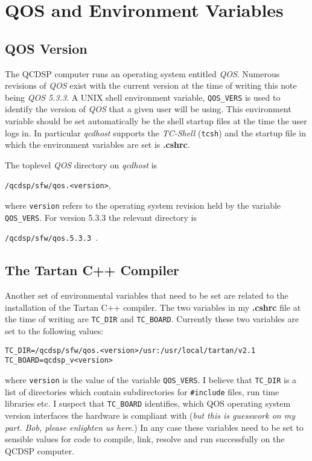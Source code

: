 \section{QOS and Environment Variables}
\subsection{QOS Version}
The QCDSP computer runs an operating system entitled {\em QOS}.
Numerous revisions of {\em QOS} exist with the current version at the
time of writing this note being {\em QOS 5.3.3}. A UNIX shell
environment variable, {\tt QOS\_VERS} is used to identify the version
of {\em QOS} that a given user will be using.  This environment
variable should be set automatically be the shell startup files at the
time the user logs in. In particular {\em qcdhost} supports the {\em
TC-Shell} ({\tt tcsh}) and the startup file in which  the environment 
variables are set is {\bf .cshrc}.

The toplevel {\em QOS} directory on {\em qcdhost} is

{\tt /qcdsp/sfw/qos.<version>}, 

where {\tt version} refers to the
operating system revision held by the variable {\tt QOS\_VERS}. For version
5.3.3 the relevant directory is 

{\tt /qcdsp/sfw/qos.5.3.3}\ .

\subsection{The Tartan C++ Compiler}
Another set of environmental variables that need to be set are related
to the installation of the Tartan C++ compiler. The two variables in 
my {\bf .cshrc} file at the time of writing are {\tt TC\_DIR} and {\tt TC\_BOARD}.
Currently these two variables are set to the following values:\begin{verbatim}
TC_DIR=/qcdsp/sfw/qos.<version>/usr:/usr/local/tartan/v2.1
TC_BOARD=qcdsp_v<version>
\end{verbatim}
where {\tt version} is the value of the variable {\tt QOS\_VERS}. I believe
that {\tt TC\_DIR} is a list of directories which contain subdirectories
for {\tt \#include} files, run time libraries etc. I suspect that {\tt TC\_BOARD}
identifies, which QOS operating system version interfaces the hardware
is compliant with ({\em but this is guesswork on my part. Bob, please enlighten us here}.) In any case these variables need to be set to sensible values
for code to compile, link, resolve and run successfully on the QCDSP computer.

